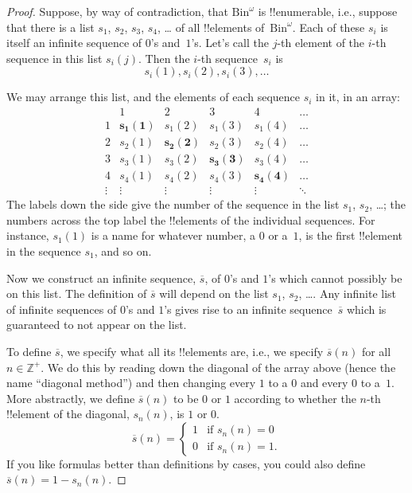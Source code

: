 \documentclass[10pt,a4paper]{article}
\theoremstyle{plain}
\theoremstyle{definition}
\theoremstyle{remark}
\providecommand{\PosInt}{\mathbb{Z}^{+}}
\providecommand{\Bin}{\mathrm{Bin}}
\begin{document}
\begin{proof}
Suppose, by way of contradiction, that $\Bin^\omega$ is
!!{enumerable}, i.e., suppose that there is a list $s_{1}$, $s_{2}$,
$s_{3}$, $s_{4}$, \dots{} of all !!{element}s of~$\Bin^\omega$.  Each
of these $s_i$ is itself an infinite sequence of $0$'s and~$1$'s.
Let's call the $j$-th element of the $i$-th sequence in this list
$s_i(j)$. Then the $i$-th sequence~$s_i$ is
\[
s_i(1), s_i(2), s_i(3), \dots
\]

We may arrange this list, and the elements of each sequence $s_i$ in
it, in an array:
\[
\begin{array}{c|c|c|c|c|c}
& 1 & 2 & 3 & 4 & \dots \\\hline
1 & \mathbf{s_{1}(1)} & s_{1}(2) & s_{1}(3) & s_1(4) & \dots \\\hline
2 & s_{2}(1)& \mathbf{s_{2}(2)} & s_2(3) & s_2(4) & \dots \\\hline
3 & s_{3}(1)& s_{3}(2) & \mathbf{s_3(3)} & s_3(4) & \dots \\\hline
4 & s_{4}(1)& s_{4}(2) & s_4(3) & \mathbf{s_4(4)} & \dots \\\hline
\vdots & \vdots & \vdots & \vdots & \vdots & \mathbf{\ddots}
\end{array}
\]
The labels down the side give the number of the sequence in the list
$s_1$, $s_2$, \dots; the numbers across the top label the !!{element}s
of the individual sequences. For instance, $s_{1}(1)$ is a name for
whatever number, a $0$ or a~$1$, is the first !!{element} in the
sequence $s_{1}$, and so on.

Now we construct an infinite sequence, $\overline{s}$, of $0$'s and
$1$'s which cannot possibly be on this list.  The definition of
$\overline{s}$ will depend on the list $s_1$, $s_2$, \dots.  Any
infinite list of infinite sequences of $0$'s and $1$'s gives rise to
an infinite sequence~$\overline{s}$ which is guaranteed to not appear
on the list.

To define $\overline{s}$, we specify what all its !!{element}s are,
i.e., we specify $\overline{s}(n)$ for all $n \in \PosInt$.  We do this
by reading down the diagonal of the array above (hence the name
``diagonal method'') and then changing every $1$ to a $0$ and every
$0$ to a~$1$. More abstractly, we define $\overline{s}(n)$ to be $0$
or $1$ according to whether the $n$-th !!{element} of the diagonal,
$s_n(n)$, is $1$ or $0$.
\[
\overline{s}(n) =
\begin{cases}
1 & \text{if $s_{n}(n) = 0$}\\
0 & \text{if $s_{n}(n) = 1$}.
\end{cases}
\]
If you like formulas better than definitions by cases, you could also
define $\overline{s}(n) = 1 - s_n(n)$.


\end{proof}
\end{document}
